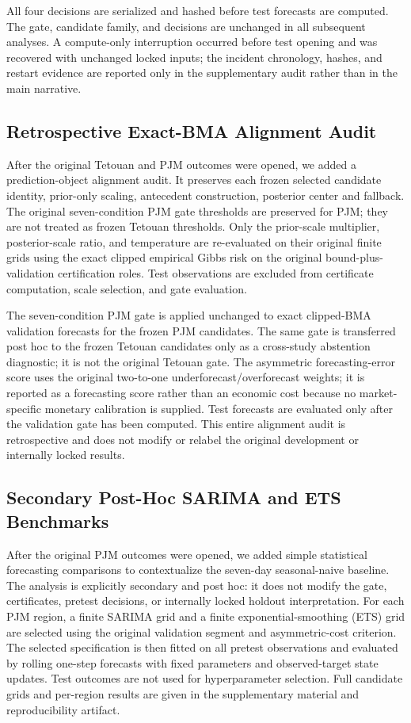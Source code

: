 All four decisions are serialized and hashed before test forecasts are computed. The gate, candidate family, and decisions are unchanged in all subsequent analyses. A compute-only interruption occurred before test opening and was recovered with unchanged locked inputs; the incident chronology, hashes, and restart evidence are reported only in the supplementary audit rather than in the main narrative.

\subsection{Retrospective Exact-BMA Alignment Audit}
After the original Tetouan and PJM outcomes were opened, we added a
prediction-object alignment audit. It preserves each frozen selected
candidate identity, prior-only scaling, antecedent construction, posterior
center and fallback. The original seven-condition PJM gate thresholds are preserved for PJM; they are not treated as frozen Tetouan thresholds. Only the prior-scale multiplier,
posterior-scale ratio, and temperature are re-evaluated on their original
finite grids using the exact clipped empirical Gibbs risk on the original
bound-plus-validation certification roles. Test observations are excluded
from certificate computation, scale selection, and gate evaluation.

The seven-condition PJM gate is applied unchanged to exact clipped-BMA
validation forecasts for the frozen PJM candidates. The same gate is
transferred post hoc to the frozen Tetouan candidates only as a cross-study
abstention diagnostic; it is not the original Tetouan gate.
The asymmetric forecasting-error score uses the original two-to-one
underforecast/overforecast weights; it is reported as a forecasting score
rather than an economic cost because no market-specific monetary calibration
is supplied. Test forecasts are evaluated only after the validation gate has
been computed. This entire alignment audit is retrospective and does not
modify or relabel the original development or internally locked results.

\subsection{Secondary Post-Hoc SARIMA and ETS Benchmarks}
After the original PJM outcomes were opened, we added simple statistical forecasting comparisons to contextualize the seven-day seasonal-naive baseline. The analysis is explicitly secondary and post hoc: it does not modify the gate, certificates, pretest decisions, or internally locked holdout interpretation. For each PJM region, a finite SARIMA grid and a finite exponential-smoothing (ETS) grid are selected using the original validation segment and asymmetric-cost criterion. The selected specification is then fitted on all pretest observations and evaluated by rolling one-step forecasts with fixed parameters and observed-target state updates. Test outcomes are not used for hyperparameter selection. Full candidate grids and per-region results are given in the supplementary material and reproducibility artifact.

